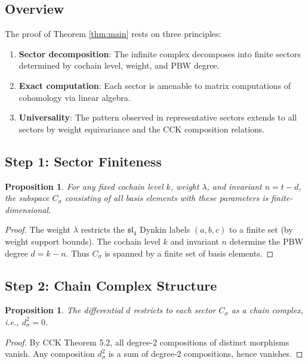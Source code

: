 \documentclass[reqno,10pt]{amsart}
\theoremstyle{plain}
\newtheorem{proposition}[theorem]{Proposition}
\theoremstyle{definition}
\newcommand{\slfrak}{\mathfrak{sl}}
\begin{document}
\subsection{Overview}

The proof of Theorem \ref{thm:main} rests on three principles:
\begin{enumerate}
  \item \textbf{Sector decomposition}: The infinite complex decomposes into 
        finite sectors determined by cochain level, weight, and PBW degree.
  \item \textbf{Exact computation}: Each sector is amenable to matrix computations 
        of cohomology via linear algebra.
  \item \textbf{Universality}: The pattern observed in representative sectors 
        extends to all sectors by weight equivariance and the CCK composition relations.
\end{enumerate}

\subsection{Step 1: Sector Finiteness}

\begin{proposition}
  For any fixed cochain level $k$, weight $\lambda$, and invariant $n = t - d$, 
  the subspace $C_\sigma$ consisting of all basis elements with these parameters 
  is finite-dimensional.
\end{proposition}

\begin{proof}
  The weight $\lambda$ restricts the $\slfrak_4$ Dynkin labels $(a,b,c)$ to a finite 
  set (by weight support bounds). The cochain level $k$ and invariant $n$ 
  determine the PBW degree $d = k - n$. Thus $C_\sigma$ is spanned by a finite 
  set of basis elements.
\end{proof}

\subsection{Step 2: Chain Complex Structure}

\begin{proposition}
  The differential $d$ restricts to each sector $C_\sigma$ as a chain complex, 
  i.e., $d_\sigma^2 = 0$.
\end{proposition}

\begin{proof}
  By CCK Theorem 5.2, all degree-2 compositions of distinct morphisms vanish. 
  Any composition $d_\sigma^2$ is a sum of degree-2 compositions, hence vanishes.
\end{proof}
\end{document}
